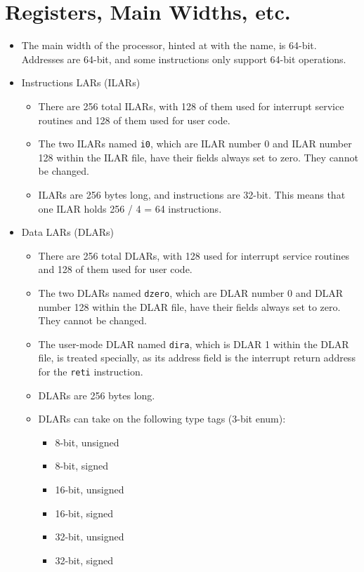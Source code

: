 \documentclass{article}
\begin{document}
\section{Registers, Main Widths, etc.}
	\begin{itemize}
	\item The main width of the processor, hinted at with the name, is
		64-bit.  Addresses are 64-bit, and some instructions only support
		64-bit operations.
	\item Instructions LARs (ILARs)
		\begin{itemize}
		\item There are 256 total ILARs, with 128 of them used for
			interrupt service routines and 128 of them used for user code.
		\item The two ILARs named \texttt{i0}, which are ILAR number 0 and
			ILAR number 128 within the ILAR file, have their fields always
			set to zero.  They cannot be changed.
		\item ILARs are 256 bytes long, and instructions are 32-bit.  This
			means that one ILAR holds 256 / 4 = 64 instructions.
		\end{itemize}
	\item Data LARs (DLARs)
		\begin{itemize}
		\item There are 256 total DLARs, with 128 used for interrupt
			service routines and 128 of them used for user code.
		\item The two DLARs named \texttt{dzero}, which are DLAR number 0
			and DLAR number 128 within the DLAR file, have their fields
			always set to zero.  They cannot be changed.
		\item The user-mode DLAR named \texttt{dira}, which is DLAR 1
			within the DLAR file, is treated specially, as its address
			field is the interrupt return address for the \texttt{reti}
			instruction.
		\item DLARs are 256 bytes long.
		\item DLARs can take on the following type tags (3-bit enum):
			\begin{itemize}
			\item 8-bit, unsigned
			\item 8-bit, signed
			\item 16-bit, unsigned
			\item 16-bit, signed
			\item 32-bit, unsigned
			\item 32-bit, signed

\end{itemize}
\end{itemize}
\end{itemize}
\end{document}
